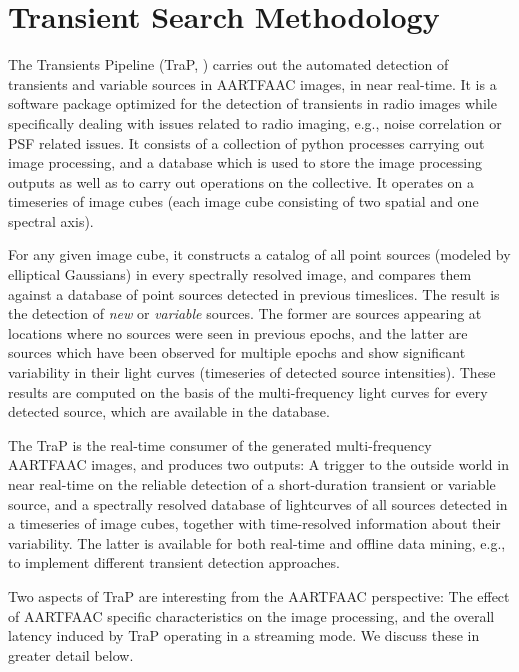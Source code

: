 \documentclass{ws-jai}
\begin{document}
\section {\label{sec:afaac_trap} Transient Search Methodology}
The  Transients  Pipeline  (TraP,  \citep{swinbank2015lofar})  carries  out  the
automated detection  of transients and  variable sources in AARTFAAC  images, in
near  real-time.  It  is  a  software package  optimized  for  the detection  of
transients in  radio images  while specifically dealing  with issues  related to
radio imaging, e.g., noise correlation or  PSF related issues.  It consists of a
collection of  python processes  carrying out image  processing, and  a database
which is  used to store  the image  processing outputs as  well as to  carry out
operations on the collective.  It operates  on a timeseries of image cubes (each
image cube consisting of two spatial and one spectral axis).

For any given image cube, it constructs  a catalog of all point sources (modeled
by elliptical Gaussians)  in every spectrally resolved image,  and compares them
against a database of point sources detected in previous timeslices.  The result
is the detection  of \textit{new} or \textit{variable} sources.   The former are
sources appearing  at locations where no  sources were seen in  previous epochs,
and the latter are sources which have been observed for multiple epochs and show
significant variability  in their  light curves  (timeseries of  detected source
intensities). These  results are  computed on the  basis of  the multi-frequency
light curves for every detected source, which are available in the database.

The TraP  is the  real-time consumer of  the generated  multi-frequency AARTFAAC
images,  and produces  two  outputs: A  trigger  to the  outside  world in  near
real-time on  the reliable detection  of a short-duration transient  or variable
source,  and  a spectrally  resolved  database  of  lightcurves of  all  sources
detected in a timeseries of image cubes, together with time-resolved information
about their variability.  The latter is available for both real-time and offline
data mining, e.g., to implement different transient detection approaches.

Two aspects of TraP are interesting from the AARTFAAC perspective: The effect of
AARTFAAC  specific characteristics  on  the image  processing,  and the  overall
latency  induced by  TraP operating  in a  streaming mode.  We discuss  these in
greater detail below.\\
\end{document}
